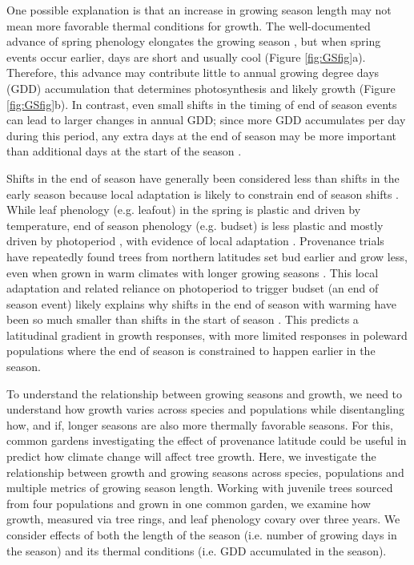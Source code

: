 \documentclass{article}\usepackage[]{graphicx}\usepackage[]{xcolor}
\begin{document}
One possible explanation is that an increase in growing season length may not mean more favorable thermal conditions for growth. The well-documented advance of spring phenology elongates the growing season \citep{keenan_net_2014}, but when spring events occur earlier, days are short and usually cool (Figure \ref{fig:GSfig}a). Therefore, this advance may contribute little to annual growing degree days (GDD) accumulation that determines photosynthesis and likely growth (Figure \ref{fig:GSfig}b). In contrast, even small shifts in the timing of end of season events can lead to larger changes in annual GDD; since more GDD accumulates per day during this period, any extra days at the end of season may be more important than additional days at the start of the season \citep{buonaiuto_early_2026}.  

Shifts in the end of season have generally been considered less than shifts in the early season because local adaptation is likely to constrain end of season shifts  \citep{wolkovich_why_2025,soolanayakanahally_timing_2013}. While leaf phenology (e.g. leafout) in the spring is plastic and driven by temperature, end of season phenology (e.g. budset) is less plastic and mostly driven by photoperiod \citep{baumgarten_indeterminacy_2026,singh_photoperiod_2017}, with evidence of local adaptation \citep{zeng_weak_2024}. Provenance trials have repeatedly found trees from northern latitudes set bud earlier and grow less, even when grown in warm climates with longer growing seasons \citep{aitken_time_2016,way_photoperiod_2015}. This local adaptation and related reliance on photoperiod to trigger budset (an end of season event) likely explains why shifts in the end of season with warming have been so much smaller than shifts in the start of season \citep{piao_plant_2019}. This predicts a latitudinal gradient in growth responses, with more limited responses in poleward populations where the end of season is constrained to happen earlier in the season.

To understand the relationship between growing seasons and growth, we need to understand how growth varies across species and populations while disentangling how, and if, longer seasons are also more thermally favorable seasons. For this, common gardens investigating the effect of provenance latitude could be useful in predict how climate change will affect tree growth. Here, we investigate the relationship between growth and growing seasons across species, populations and multiple metrics of growing season length. Working with juvenile trees sourced from four populations and grown in one common garden, we examine how growth, measured via tree rings, and leaf phenology covary over three years. We consider effects of both the length of the season (i.e. number of growing days in the season) and its thermal conditions (i.e. GDD accumulated in the season). 
\end{document}
